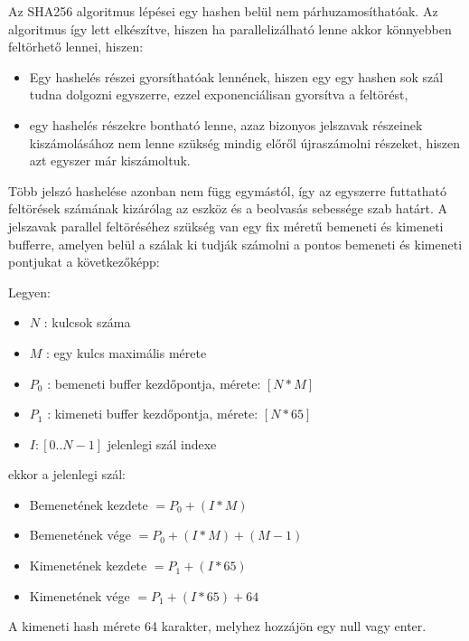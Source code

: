 Az SHA256 algoritmus lépései egy hashen belül nem párhuzamosíthatóak. Az algoritmus így lett elkészítve, hiszen ha parallelizálható lenne akkor könnyebben feltörhető lennei, hiszen:
%
\begin{itemize}
    \item Egy hashelés részei gyorsíthatóak lennének, hiszen egy egy hashen sok szál tudna dolgozni egyszerre, ezzel exponenciálisan gyorsítva a feltörést,
    \item egy hashelés részekre bontható lenne, azaz bizonyos jelszavak részeinek kiszámolásához nem lenne szükség mindig előről újraszámolni részeket, hiszen azt egyszer már kiszámoltuk.
\end{itemize}
%
Több jelszó hashelése azonban nem függ egymástól, így az egyszerre futtatható feltörések számának kizárólag az eszköz és a beolvasás sebessége szab határt. A jelszavak parallel feltöréséhez szükség van egy fix méretű bemeneti és kimeneti bufferre, amelyen belül a szálak ki tudják számolni a pontos bemeneti és kimeneti pontjukat a következőképp:

Legyen:
\begin{itemize}
    \itemsep-0.5em
    \item $N$ : kulcsok száma
    \item $M$ : egy kulcs maximális mérete
    \item $P_0$ : bemeneti buffer kezdőpontja, mérete: $[N * M]$
    \item $P_1$ : kimeneti buffer kezdőpontja, mérete: $[N * 65]$
    \item $I : [0 .. N-1]$ jelenlegi szál indexe
\end{itemize}


ekkor a jelenlegi szál:


\begin{itemize}
    \itemsep-0.5em
    \item Bemenetének kezdete $ = P_0 + (I * M) $
    \item Bemenetének vége $ = P_0 + (I * M) + (M - 1) $
    \item Kimenetének kezdete $ = P_1 + (I * 65) $
    \item Kimenetének vége $ = P_1 + (I * 65) + 64 $
\end{itemize}

A kimeneti hash mérete 64 karakter, melyhez hozzájön egy null vagy enter.


